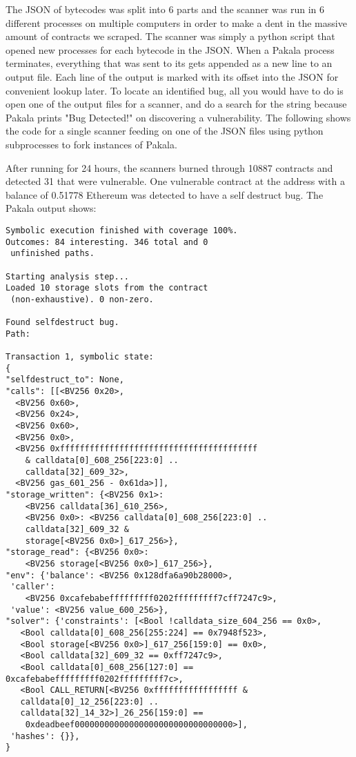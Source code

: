 The JSON of bytecodes was split into 6 parts and the scanner was run in 6 different processes on multiple computers in order to make a dent in the massive amount of contracts we scraped.
The scanner was simply a python script that opened new processes for each bytecode in the JSON.
When a Pakala process terminates, everything that was sent to its  gets appended as a new line to an output file.
Each line of the output is marked with its offset into the JSON for convenient lookup later.
To locate an identified bug, all you would have to do is open one of the output files for a scanner, and do a search for the string  because Pakala prints "Bug Detected!" on discovering a vulnerability.
The following shows the code for a single scanner feeding on one of the JSON files using python subprocesses to fork instances of Pakala.


After running for 24 hours, the scanners burned through 10887 contracts and detected 31 that were vulnerable.
One vulnerable contract at the address  with a balance of 0.51778 Ethereum was detected to have a self destruct bug.
The Pakala output shows:\\

\begin{lstlisting}[basicstyle=\small]
Symbolic execution finished with coverage 100%.
Outcomes: 84 interesting. 346 total and 0 
 unfinished paths.

Starting analysis step...
Loaded 10 storage slots from the contract 
 (non-exhaustive). 0 non-zero.

Found selfdestruct bug.
Path:

Transaction 1, symbolic state:
{
"selfdestruct_to": None,
"calls": [[<BV256 0x20>,
  <BV256 0x60>,
  <BV256 0x24>,
  <BV256 0x60>,
  <BV256 0x0>,
  <BV256 0xffffffffffffffffffffffffffffffffffffffff 
    & calldata[0]_608_256[223:0] .. 
    calldata[32]_609_32>,
  <BV256 gas_601_256 - 0x61da>]],
"storage_written": {<BV256 0x1>: 
    <BV256 calldata[36]_610_256>, 
    <BV256 0x0>: <BV256 calldata[0]_608_256[223:0] .. 
    calldata[32]_609_32 & 
    storage[<BV256 0x0>]_617_256>},
"storage_read": {<BV256 0x0>: 
    <BV256 storage[<BV256 0x0>]_617_256>},
"env": {'balance': <BV256 0x128dfa6a90b28000>,
 'caller': 
    <BV256 0xcafebabefffffffff0202fffffffff7cff7247c9>,
 'value': <BV256 value_600_256>},
"solver": {'constraints': [<Bool !calldata_size_604_256 == 0x0>,
   <Bool calldata[0]_608_256[255:224] == 0x7948f523>,
   <Bool storage[<BV256 0x0>]_617_256[159:0] == 0x0>,
   <Bool calldata[32]_609_32 == 0xff7247c9>,
   <Bool calldata[0]_608_256[127:0] == 0xcafebabefffffffff0202fffffffff7c>,
   <Bool CALL_RETURN[<BV256 0xfffffffffffffffff & 
   calldata[0]_12_256[223:0] .. 
   calldata[32]_14_32>]_26_256[159:0] == 
    0xdeadbeef00000000000000000000000000000000>],
 'hashes': {}},
}
\end{lstlisting}

